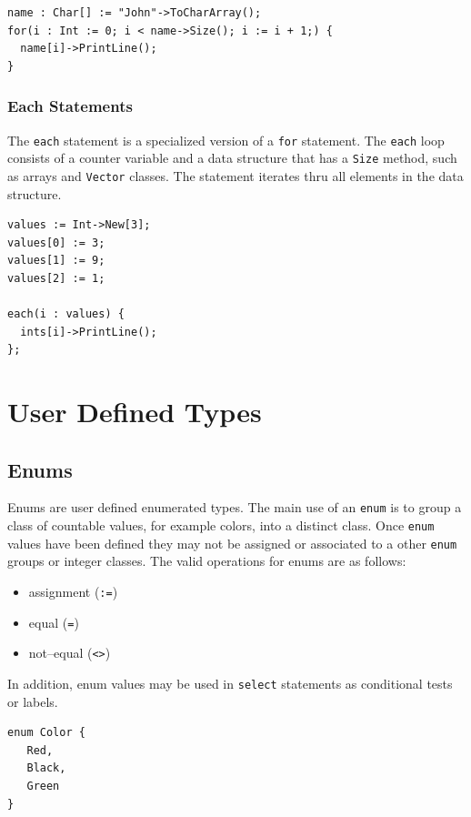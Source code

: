 \documentclass[12pt]{article}
\begin{document}
\begin{verbatim}
name : Char[] := "John"->ToCharArray();
for(i : Int := 0; i < name->Size(); i := i + 1;) {
  name[i]->PrintLine();
}
\end{verbatim}

\subsubsection{Each Statements}

The \texttt{each} statement is a specialized version of a \texttt{for} statement.  The \texttt{each} loop consists of a counter variable and a data structure that has a \texttt{Size} method, such as arrays and \texttt{Vector} classes.  The statement iterates thru all elements in the data structure.

\begin{verbatim}
values := Int->New[3];
values[0] := 3;
values[1] := 9;
values[2] := 1;

each(i : values) {
  ints[i]->PrintLine();
};
\end{verbatim}

\section{User Defined Types}

\subsection{Enums}
Enums are user defined enumerated types.  The main use of an  \texttt{enum}  is to group a class of countable values, for example colors, into a distinct class.  Once \texttt{enum}  values have been defined they may not be assigned or associated to a other \texttt{enum}  groups or integer classes.  The valid operations for enums are as follows:

\begin{itemize}
    \item assignment (\texttt{:=})
    \item equal (\texttt{=})
    \item not--equal (\texttt{<>})
\end{itemize}

In addition, enum values may be used in \texttt{select} statements as conditional tests or labels.

\begin{verbatim}
enum Color {
   Red,
   Black,
   Green
}
\end{verbatim}
\end{document}
